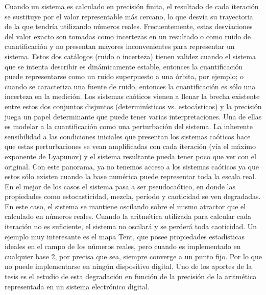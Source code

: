 Cuando un sistema es calculado en precisión finita, el resultado de cada iteración se sustituye por el valor representable más cercano, lo que desvía su trayectoria de la que tendría utilizando números reales.
Frecuentemente, estas desviaciones del valor exacto son tomadas como incertezas en un resultado o como ruido de cuantificación y no presentan mayores inconvenientes para representar un sistema.
Estos dos catálogos (ruido o incerteza) tienen validez cuando el sistema que se intenta describir es dinámicamente estable, entonces la cuantificación puede representarse como un ruido superpuesto a una órbita, por ejemplo; o cuando se caracteriza una fuente de ruido, entonces la cuantificación es sólo una incerteza en la medición.
Los sistemas caóticos vienen a llenar la brecha existente entre estos dos conjuntos disjuntos (determinísticos vs. estocásticos) y la precisión juega un papel determinante que puede tener varias interpretaciones.
Una de ellas es modelar a la cuantificación como una perturbación del sistema.
La inherente sensibilidad a las condiciones iniciales que presentan los sistemas caóticos hace que estas perturbaciones se vean amplificadas con cada iteración (vía el máximo exponente de Lyapunov) y el sistema resultante pueda tener poco que ver con el original.
Con este panorama, ya no tenemos acceso a los sistemas caóticos ya que estos sólo existen cuando la base numérica puede representar toda la escala real.
En el mejor de los casos el sistema pasa a ser pseudocaótico, en donde las propiedades como estocasticidad, mezcla, período y caoticidad se ven degradadas.
En este caso, el sistema se mantiene oscilando sobre el mismo atractor que el calculado en números reales.
Cuando la aritmética utilizada para calcular cada iteración no es suficiente, el sistema no oscilará y se perderá toda caoticidad.
Un ejemplo muy interesante es el mapa Tent, que posee propiedades estadísticas ideales en el campo de los números reales, pero cuando es implementado en cualquier base 2, por precisa que sea, siempre converge a un punto fijo.
Por lo que no puede implementarse en ningún dispositivo digital.
Uno de los aportes de la tesis es el estudio de esta degradación en función de la precisión de la aritmética representada en un sistema electrónico digital.

